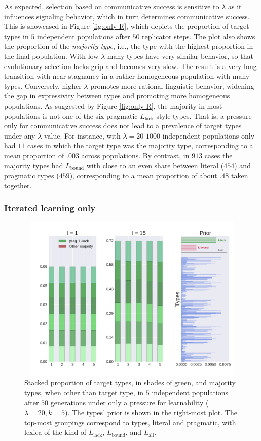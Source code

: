 \documentclass[a4paper, 11pt]{article}
\theoremstyle{Satz}
\newcommand{\mylang}[1]{\ensuremath{L_{\text{#1}}}\xspace} %
\newcommand{\Lall}{\mylang{all}}
\newcommand{\Lbound}{\mylang{bound}}
\newcommand{\Llack}{\mylang{lack}}
\begin{document}
As expected, selection based on communicative success is sensitive to $\lambda$ as it
influences signaling behavior, which in turn determines communicative success. This is
showcased in Figure \ref{fig:only-R}, which depicts the proportion of target types in $5$
independent populations after $50$ replicator steps. The plot also shows the proportion of the
\emph{majority type}, i.e., the type with the highest proportion in the final population. With
low $\lambda$ many types have very similar behavior, so that evolutionary selection lacks grip
and becomes very slow. The result is a very long transition with near stagnancy in a rather
homogeneous population with many types. Conversely, higher $\lambda$ promotes more rational
linguistic behavior, widening the gap in expressivity between types and promoting more
homogeneous populations. As suggested by Figure \ref{fig:only-R}, the majority in most
populations is not one of the six pragmatic $\Llack$-style types. That is, a pressure only for
communicative success does not lead to a prevalence of target types under any $\lambda$-value. For
instance, with $\lambda = 20$ $1000$ independent populations only had $11$ cases in which
the target type was the majority type, corresponding to a mean proportion of $.003$ across
populations. By contrast, in $913$ cases the majority types had $\Lbound$ with close to an even
share between literal ($454$) and pragmatic types ($459$), corresponding to a mean proportion
of about $.48$ taken together.


\subsubsection{Iterated learning only}

\begin{figure}[t]
\centering
\includegraphics[width=1\textwidth,height=8cm,keepaspectratio]{./plots/fig2-onlym-pr}
\caption{Stacked proportion of target types, in shades of green, and majority types, when other than target type, in $5$ independent populations after $50$ generations under only a pressure for learnability ($\lambda = 20, k = 5$). The types' prior is shown in
  the right-most plot. The top-most groupings correspond to types, literal and pragmatic, with lexica of the kind of $\Llack$, $\Lbound$, and $\Lall$.}
\label{fig:only-M}
\end{figure}
\end{document}
